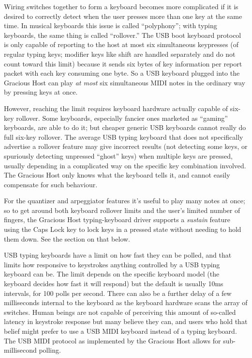 Wiring switches together to form a keyboard becomes more complicated if it
is desired to correctly detect when the user presses more than one key at
the same time.  In musical keyboards this issue is called ``polyphony'';
with typing keyboards, the same thing is called ``rollover.'' The USB boot
keyboard protocol is only capable of reporting to the host at most six
simultaneous keypresses (of regular typing keys; modifier keys like shift
are handled separately and do not count toward this limit) because it sends
six bytes of key information per report packet with each key consuming one
byte.  So a USB keyboard plugged into the Gracious Host can play \emph{at
most} six simultaneous MIDI notes in the ordinary way by pressing keys
at once.

However, reaching the limit requires keyboard hardware actually capable of
six-key rollover.  Some keyboards, especially fancier ones marketed as
``gaming'' keyboards, are able to do it; but cheaper generic USB keyboards
cannot really do full six-key rollover.  The average USB typing keyboard
that does not specifically advertise a rollover feature may give
incorrect results (not detecting some keys, or spuriously detecting
unpressed ``ghost'' keys) when multiple keys are pressed, usually depending
in a complicated way on the specific key combination involved.  The
Gracious Host only knows what the keyboard tells it, and cannot easily
compensate for such behaviour.

For the quantizer and arpeggiator features it's useful to play many notes at
once; so to get around both keyboard rollover limits and the user's limited
number of fingers, the Gracious Host typing-keyboard driver supports a
\emph{sustain} feature using the Caps Lock key to lock keys in a pressed
state without needing to hold them down.  See the section on that below.

USB typing keyboards have a limit on how fast they can be polled, and that
limits how responsive to keystrokes anything controlled by a USB typing
keyboard can be.  The limit depends on the specific keyboard model (the
keyboard decides how fast it will respond) but the default is usually
10ms intervals, for 100 polls per second.  There can also be a further delay
of a few milliseconds internal to the keyboard as the keyboard hardware
scans the array of switches.  Human beings are not capable of perceiving this
amount of so-called latency in keystroke response but many believe
they can, and users who hold that belief might prefer to use a USB MIDI
keyboard instead of a typing keyboard.  The USB MIDI protocol as implemented
by the Gracious Host allows for sub-millisecond polling.

